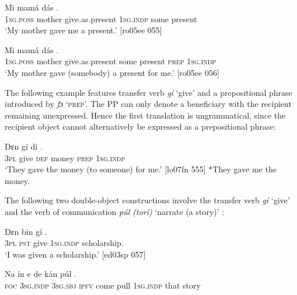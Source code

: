 \ea%
    \label{ex:key:1203}
    \gll Mi    mamá  dás               .\\
\textsc{1sg.poss}  mother  give.as.present  \textsc{1sg.indp}  some  present\\

\glt ‘My mother gave me a present.’ [ro05ee 055]
\z


\ea%
    \label{ex:key:1204}
    \gll Mi    mamá  dás               .\\
\textsc{1sg.poss}  mother  give.as.present  some  present  \textsc{prep}  \textsc{1sg.indp}\\

\glt ‘My mother gave (somebody) a present for me.’ [ro05ee 056]
\z

The following example features transfer verb \textit{gí} ‘give’ and a prepositional phrase introduced by \textit{fɔ} ‘\textsc{prep}’. The PP can only denote a beneficiary with the recipient remaining unexpressed. Hence the first translation is ungrammatical, since the recipient object cannot alternatively be expressed as a prepositional phrase:


\ea%
    \label{ex:key:1205}
    \gll Dɛn  gí  di        .\\
\textsc{3pl}  give  \textsc{def}  money    \textsc{prep}  \textsc{1sg.indp}\\

\glt 
 ‘They gave the money (to someone) for me.’ [lo07fn 555]
*They gave me the money. 
\z

The following two double-object constructions involve the transfer verb \textit{gí} ‘give’  and the verb of communication \textit{púl (torí)} ‘narrate (a story)’ :


\ea%
    \label{ex:key:1206}
    \gll Dɛn    bin  gí          .\\
\textsc{3pl}    \textsc{pst}  give    \textsc{1sg.indp}    scholarship.\\

\glt ‘I was given a scholarship.’ [ed03sp 057]
\z


\ea%
    \label{ex:key:1207}
    \gll Na  ín    e    de  kán    púl        .\\
\textsc{foc}  \textsc{3sg.indp}  \textsc{3sg.sbj}  \textsc{ipfv}  come  pull  \textsc{1sg.indp}  that  story\\

